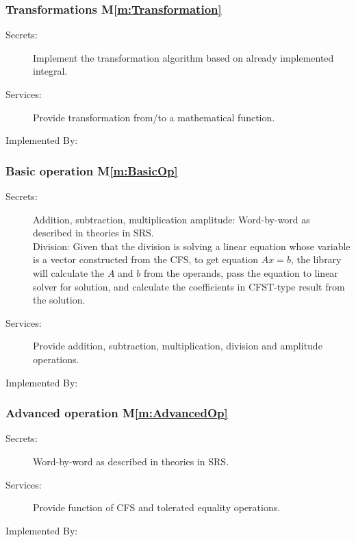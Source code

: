 \documentclass[12pt, titlepage]{article}
\newcommand{\mref}[1]{M\ref{m:#1}}
\begin{document}
\subsubsection{Transformations \mref{Transformation}}
\begin{description}
	\item[Secrets:] Implement the transformation algorithm based on already implemented integral.
	\item[Services:] Provide transformation from/to a mathematical function.
	\item[Implemented By:] \progname
\end{description}
\subsubsection{Basic operation \mref{BasicOp}}
\begin{description}
	\item[Secrets:] Addition, subtraction, multiplication amplitude: Word-by-word as described in theories in SRS.\\
	Division: Given that the division is solving a linear equation whose variable is a vector constructed from the CFS, to get equation $Ax=b$, the library will calculate the $A$ and $b$ from the operands, pass the equation to linear solver for solution, and calculate the coefficients in CFST-type result from the solution.
	\item[Services:] Provide addition, subtraction, multiplication, division and amplitude operations.
	\item[Implemented By:] \progname
\end{description}
\subsubsection{Advanced operation \mref{AdvancedOp}}
\begin{description}
	\item[Secrets:] Word-by-word as described in theories in SRS. 
        
	\item[Services:] Provide function of CFS and tolerated equality operations.
	\item[Implemented By:] \progname
\end{description}
\end{document}
